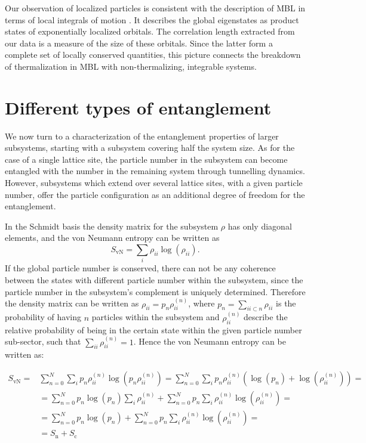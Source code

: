 Our observation of localized particles is consistent with the description of MBL in terms of local integrals of motion \cite{Serbyn2013, Serbyn2013b, Huse2014}. It describes the global eigenstates as product states of exponentially localized orbitals. The correlation length extracted from our data is a measure of the size of these orbitals. Since the latter form a complete set of locally conserved quantities, this picture connects the breakdown of thermalization in MBL with non-thermalizing, integrable systems. 

\section{Different types of entanglement}

We now turn to a characterization of the entanglement properties of larger subsystems, starting with a subsystem covering half the system size. As for the case of a single lattice site, the particle number in the subsystem can become entangled with the number in the remaining system through tunnelling dynamics. However, subsystems which extend over several lattice sites, with a given particle number, offer the particle configuration as an additional degree of freedom for the entanglement. 

In the Schmidt basis the density matrix for the subsystem $\rho$ has only diagonal elements, and the von Neumann entropy can be written as
\begin{equation}\label{eqn:Svn}
S_\text{vN}=\sum_i \rho_{ii} \log {\left ( \rho_{ii} \right )}.
\end{equation}
If the global particle number is conserved, there can not be any coherence between the states with different particle number
within the subsystem, since the particle number in the subsystem's complement is uniquely determined. Therefore  the density matrix can be written as $\rho_{ii} = p_n \rho_{ii}^{(n)}$, where $p_n = \sum_{ii \subset n} \rho_{ii}$ is the probability of having $n$ particles within the subsystem and $\rho_{ii}^{(n)}$ describe the relative probability of being in the certain state within the given particle number sub-sector, such that $\sum_{ii} \rho_{ii}^{(n)}=1$. Hence the von Neumann entropy can be written as:

\begin{equation}\label{eqn:Svn}
\begin{aligned}
S_\text{vN}=&\sum_{n=0}^N \sum_i p_n  \rho_{ii}^{(n)} \log {\left (p_n \rho_{ii}^{(n)} \right )}=\sum_{n=0}^N \sum_i p_n  \rho_{ii}^{(n)} \left (\log{\left ( p_n \right )} + \log {\left ( \rho_{ii}^{(n)} \right )} \right ) = \\
&=\sum_{n=0}^N p_n  \log{\left ( p_n \right )}  \sum_i \rho_{ii}^{(n)} + \sum_{n=0}^N p_n \sum_{i} \rho_{ii}^{(n)} \log {\left ( \rho_{ii}^{(n)} \right )} = \\
&=\sum_{n=0}^N p_n  \log{\left ( p_n \right )}  + \sum_{n=0}^N p_n \sum_{i} \rho_{ii}^{(n)} \log {\left ( \rho_{ii}^{(n)} \right )}=\\
&=S_\text{n} + S_\text{c}
\end{aligned}
\end{equation}

